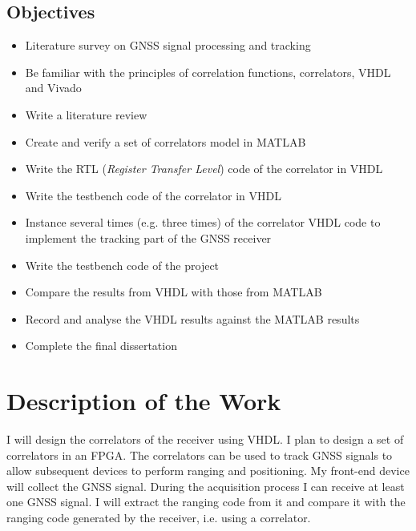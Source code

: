 \subsection{Objectives}
\begin{itemize}
    \item Literature survey on GNSS signal processing and tracking
    \item Be familiar with the principles of correlation functions, correlators, VHDL and Vivado
    \item Write a literature review
    \item Create and verify a set of correlators model in MATLAB
    \item Write the RTL (\textit{Register Transfer Level}) code of the correlator in VHDL
    \item Write the testbench code of the correlator in VHDL
    \item Instance several times (e.g. three times) of the correlator VHDL code to implement the tracking part of the GNSS receiver
    \item Write the testbench code of the project
    \item Compare the results from VHDL with those from MATLAB
    \item Record and analyse the VHDL results against the MATLAB results
    \item Complete the final dissertation
\end{itemize}

\section{Description of the Work}
I will design the correlators of the receiver using VHDL. I plan to design a set of correlators in an FPGA. The correlators can be used to track GNSS signals to allow subsequent devices to perform ranging and positioning. My front-end device will collect the GNSS signal. During the acquisition process I can receive at least one GNSS signal. I will extract the ranging code from it and compare it with the ranging code generated by the receiver, i.e. using a correlator.

